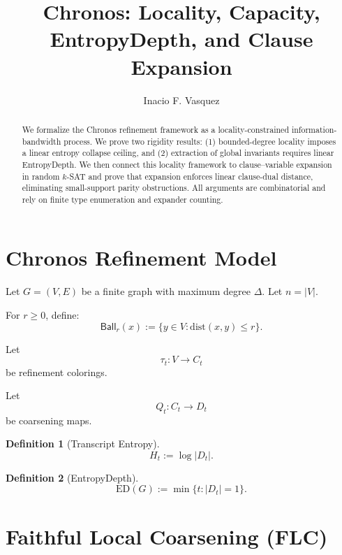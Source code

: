 \documentclass[11pt]{article}
\title{Chronos: Locality, Capacity, EntropyDepth, and Clause Expansion}
\author{Inacio F. Vasquez}
\date{}
\newtheorem{definition}{Definition}
\newcommand{\Ball}{\mathsf{Ball}}
\newcommand{\ED}{\mathrm{ED}}
\newcommand{\dist}{\mathrm{dist}}
\begin{document}
\maketitle

\begin{abstract}
We formalize the Chronos refinement framework as a locality-constrained
information-bandwidth process. We prove two rigidity results:
(1) bounded-degree locality imposes a linear entropy collapse ceiling,
and (2) extraction of global invariants requires linear EntropyDepth.
We then connect this locality framework to clause--variable expansion
in random $k$-SAT and prove that expansion enforces linear
clause-dual distance, eliminating small-support parity obstructions.
All arguments are combinatorial and rely on finite type enumeration
and expander counting.
\end{abstract}

\section{Chronos Refinement Model}

Let $G=(V,E)$ be a finite graph with maximum degree $\Delta$.
Let $n = |V|$.

For $r \ge 0$, define:
\[
\Ball_r(x) := \{ y \in V : \dist(x,y) \le r \}.
\]

Let
\[
\tau_t : V \to C_t
\]
be refinement colorings.

Let
\[
Q_t : C_t \to D_t
\]
be coarsening maps.

\begin{definition}[Transcript Entropy]
\[
H_t := \log |D_t|.
\]
\end{definition}

\begin{definition}[EntropyDepth]
\[
\ED(G) := \min \{ t : |D_t| = 1 \}.
\]
\end{definition}

\section{Faithful Local Coarsening (FLC)}
\end{document}

